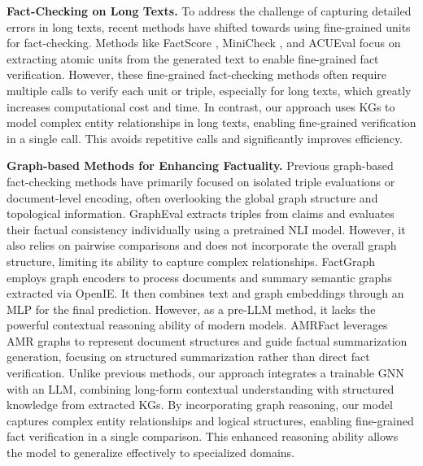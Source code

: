 \noindent\textbf{Fact-Checking on Long Texts.}
To address the challenge of capturing detailed errors in long texts, recent methods have shifted towards using fine-grained units for fact-checking. 
Methods like FactScore \cite{min2023factscore}, MiniCheck \cite{tang2024minicheck}, and ACUEval \cite{wan2024acueval} focus on extracting atomic units from the generated text to enable fine-grained fact verification. 
However, these fine-grained fact-checking methods often require multiple calls to verify each unit or triple, especially for long texts, which greatly increases computational cost and time.
In contrast, our approach uses KGs to model complex entity relationships in long texts, enabling fine-grained verification in a single call. This avoids repetitive calls and significantly improves efficiency.

\noindent\textbf{Graph-based Methods for Enhancing Factuality. }
Previous graph-based fact-checking methods have primarily focused on isolated triple evaluations or document-level encoding, often overlooking the global graph structure and topological information. 
GraphEval \cite{liu2024evaluating} extracts triples from claims and evaluates their factual consistency individually using a pretrained NLI model. 
However, it also relies on pairwise comparisons and does not incorporate the overall graph structure, limiting its ability to capture complex relationships. 
FactGraph \cite{ribeiro2022factgraph} employs graph encoders to process documents and summary semantic graphs extracted via OpenIE. It then combines text and graph embeddings through an MLP for the final prediction. 
However, as a pre-LLM method, it lacks the powerful contextual reasoning ability of modern models. 
AMRFact \cite{qiu_amrfact_2024} leverages AMR graphs to represent document structures and guide factual summarization generation, focusing on structured summarization rather than direct fact verification.
Unlike previous methods, our approach integrates a trainable GNN with an LLM, combining long-form contextual understanding with structured knowledge from extracted KGs. By incorporating graph reasoning, our model captures complex entity relationships and logical structures, enabling fine-grained fact verification in a single comparison. 
This enhanced reasoning ability allows the model to generalize effectively to specialized domains.


